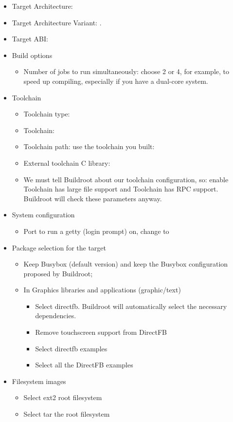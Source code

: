 \begin{itemize}
\item Target Architecture: 
\item Target Architecture Variant: .
\item Target ABI: 
\item Build options
  \begin{itemize}
  \item Number of jobs to run simultaneously: choose 2 or 4, for
    example, to speed up compiling, especially if you have a dual-core
    system.
  \end{itemize}
\item Toolchain
  \begin{itemize}
  \item Toolchain type: 
  \item Toolchain: 
  \item Toolchain path: use the toolchain you built:
  \item External toolchain C library: 
  \item We must tell Buildroot about our toolchain configuration, so:
    enable Toolchain has large file support and Toolchain has RPC
    support. Buildroot will check these parameters anyway.
  \end{itemize}
\item System configuration
  \begin{itemize}
  \item Port to run a getty (login prompt) on, change  to 
  \end{itemize}
\item Package selection for the target
  \begin{itemize}
  \item Keep Busybox (default version) and keep the Busybox
    configuration proposed by Buildroot;
  \item In Graphics libraries and applications (graphic/text)
    \begin{itemize}
    \item Select directfb. Buildroot will automatically select the
      necessary dependencies.
    \item Remove touchscreen support from DirectFB
    \item Select directfb examples
    \item Select all the DirectFB examples
    \end{itemize}
  \end{itemize}
\item Filesystem images
  \begin{itemize}
  \item Select ext2 root filesystem
  \item Select tar the root filesystem
  \end{itemize}
\end{itemize}

